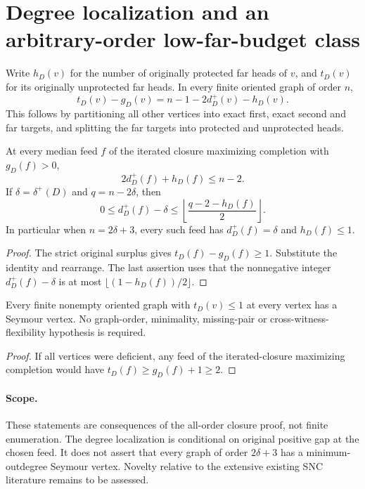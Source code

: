 \section{Degree localization and an arbitrary-order low-far-budget class}
\label{sec:closure-degree-low-budget-corollaries}

Write $h_D(v)$ for the number of originally protected far heads of $v$,
and $t_D(v)$ for its originally unprotected far heads. In every finite
oriented graph of order $n$,
\[
 t_D(v)-g_D(v)=n-1-2d_D^+(v)-h_D(v).
\]
This follows by partitioning all other vertices into exact first,
exact second and far targets, and splitting the far targets into
protected and unprotected heads.

\begin{corollary}
\label{cor:closure-adjusted-degree-localization}
At every median feed $f$ of the iterated closure maximizing completion
with $g_D(f)>0$,
\[
 2d_D^+(f)+h_D(f)\le n-2.
\]
If $\delta=\delta^+(D)$ and $q=n-2\delta$, then
\[
 0\le d_D^+(f)-\delta
     \le\left\lfloor\frac{q-2-h_D(f)}2\right\rfloor.
\]
In particular when $n=2\delta+3$, every such feed has
$d_D^+(f)=\delta$ and $h_D(f)\le1$.
\end{corollary}
\begin{proof}
The strict original surplus gives $t_D(f)-g_D(f)\ge1$.
Substitute the identity and rearrange. The last assertion uses that
the nonnegative integer $d_D^+(f)-\delta$ is at most
$\lfloor(1-h_D(f))/2\rfloor$.
\end{proof}

\begin{corollary}
\label{cor:closure-all-low-far-heads-snc}
Every finite nonempty oriented graph with $t_D(v)\le1$ at every vertex
has a Seymour vertex. No graph-order, minimality, missing-pair or
cross-witness-flexibility hypothesis is required.
\end{corollary}
\begin{proof}
If all vertices were deficient, any feed of the iterated-closure
maximizing completion would have $t_D(f)\ge g_D(f)+1\ge2$.
\end{proof}

\paragraph{Scope.}
These statements are consequences of the all-order closure proof, not
finite enumeration. The degree localization is conditional on original
positive gap at the chosen feed. It does not assert that every graph
of order $2\delta+3$ has a minimum-outdegree Seymour vertex.
Novelty relative to the extensive existing SNC literature remains to
be assessed.
